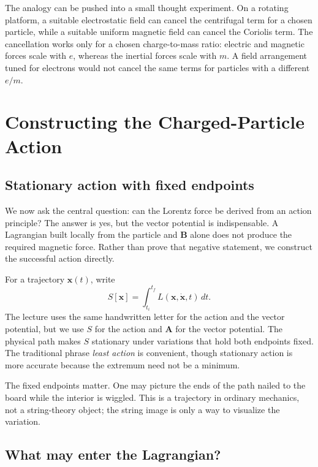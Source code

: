 The analogy can be pushed into a small thought experiment. On a rotating platform, a suitable electrostatic field can cancel the centrifugal term for a chosen particle, while a suitable uniform magnetic field can cancel the Coriolis term. The cancellation works only for a chosen charge-to-mass ratio: electric and magnetic forces scale with \(e\), whereas the inertial forces scale with \(m\). A field arrangement tuned for electrons would not cancel the same terms for particles with a different \(e/m\).

\section{Constructing the Charged-Particle Action}

\subsection{Stationary action with fixed endpoints}

We now ask the central question: can the Lorentz force be derived from an action principle? The answer is yes, but the vector potential is indispensable. A Lagrangian built locally from the particle and \(\mathbf B\) alone does not produce the required magnetic force. Rather than prove that negative statement, we construct the successful action directly.

For a trajectory \(\mathbf x(t)\), write
\begin{equation}
  S[\mathbf x]
  =
  \int_{t_i}^{t_f}L(\mathbf x,\dot{\mathbf x},t)\,dt.
\end{equation}
The lecture uses the same handwritten letter for the action and the vector potential, but we use \(S\) for the action and \(\mathbf A\) for the vector potential. The physical path makes \(S\) stationary under variations that hold both endpoints fixed. The traditional phrase \emph{least action} is convenient, though stationary action is more accurate because the extremum need not be a minimum.

The fixed endpoints matter. One may picture the ends of the path nailed to the board while the interior is wiggled. This is a trajectory in ordinary mechanics, not a string-theory object; the string image is only a way to visualize the variation.

\subsection{What may enter the Lagrangian?}

